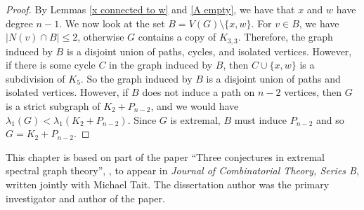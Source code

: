 \begin{proof}
By Lemmas \ref{x connected to w} and \ref{A empty}, we have that $x$ and $w$ have degree $n-1$. We now look at the set $B = V(G) \setminus \{x,w\}$. For $v\in B$, we have $|N(v) \cap B| \leq 2$, otherwise $G$ contains a copy of $K_{3,3}$. Therefore, the graph induced by $B$ is a disjoint union of paths, cycles, and isolated vertices. However, if there is some cycle $C$ in the graph induced by $B$, then $C \cup\{x,w\}$ is a subdivision of $K_5$. So the graph induced by $B$ is a disjoint union of paths and isolated vertices. However, if $B$ does not induce a path on $n-2$ vertices, then $G$ is a strict subgraph of $K_2 + P_{n-2}$, and we would have $\lambda_1(G) < \lambda_1(K_2 + P_{n-2})$. Since $G$ is extremal, $B$ must induce $P_{n-2}$ and so $G = K_2 + P_{n-2}$.
\end{proof}

This chapter is based on part of the paper ``Three conjectures in extremal spectral graph theory'',
 \cite{TaitTobin2017}, to appear in \textit{Journal of Combinatorial Theory, Series B},
written jointly with Michael Tait.  The dissertation
author was the primary investigator and author of the paper.
